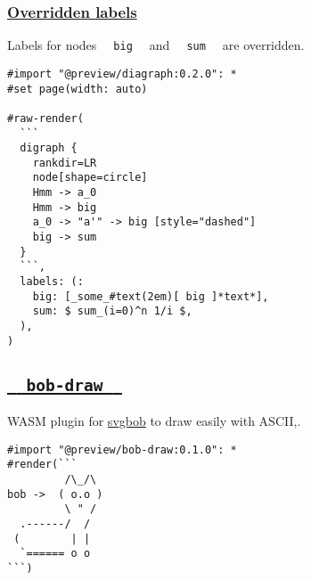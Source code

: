 \pandocbounded{}

\subsubsection{\texorpdfstring{\hyperref[overridden-labels]{Overridden
labels}}{Overridden labels}}\label{overridden-labels}

Labels for nodes \texttt{\ }{\texttt{\ big\ }}\texttt{\ } and
\texttt{\ }{\texttt{\ sum\ }}\texttt{\ } are overridden.

\begin{verbatim}
#import "@preview/diagraph:0.2.0": *
#set page(width: auto)

#raw-render(
  ```
  digraph {
    rankdir=LR
    node[shape=circle]
    Hmm -> a_0
    Hmm -> big
    a_0 -> "a'" -> big [style="dashed"]
    big -> sum
  }
  ```,
  labels: (:
    big: [_some_#text(2em)[ big ]*text*],
    sum: $ sum_(i=0)^n 1/i $,
  ),
)
\end{verbatim}

\pandocbounded{}

\subsection{\texorpdfstring{\hyperref[bob-draw]{\texttt{\ }{\texttt{\ bob-draw\ }}\texttt{\ }}}{  bob-draw  }}\label{bob-draw}

WASM plugin for \href{https://github.com/ivanceras/svgbob}{svgbob} to
draw easily with ASCII,.

\begin{verbatim}
#import "@preview/bob-draw:0.1.0": *
#render(```
         /\_/\
bob ->  ( o.o )
         \ " /
  .------/  /
 (        | |
  `====== o o
```)
\end{verbatim}

\pandocbounded{}

